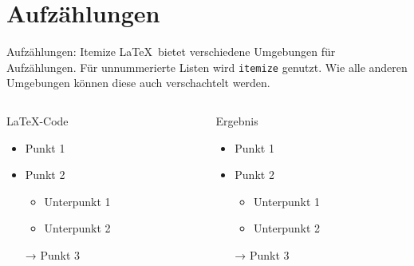 \section{Aufzählungen}

\begin{frame}[fragile]{Aufzählungen: Itemize}
  \LaTeX\ bietet verschiedene Umgebungen für Aufzählungen.
  Für unnummerierte Listen wird \texttt{itemize} genutzt.
  Wie alle anderen Umgebungen können diese auch verschachtelt werden.
  \begin{columns}[t]
    \begin{column}{0.47\textwidth}
      \begin{block}{\LaTeX-Code}
        \begin{lstverbatim}
        \begin{itemize}
          \item Punkt 1
          \item Punkt 2
            \begin{itemize}
              \item Unterpunkt 1
              \item Unterpunkt 2
            \end{itemize}
          \item[→] Punkt 3
        \end{itemize}
        \end{lstverbatim}
      \end{block}
    \end{column}
    \begin{column}{0.47\textwidth}
      \begin{block}{Ergebnis}
        \begin{itemize}
          \item Punkt 1
          \item Punkt 2
            \begin{itemize}
              \item Unterpunkt 1
              \item Unterpunkt 2
            \end{itemize}
          \item[→] Punkt 3
        \end{itemize}
      \end{block}
    \end{column}
  \end{columns}
\end{frame}

